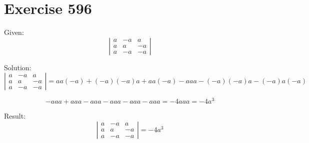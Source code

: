 \documentclass[a4paper, 10pt]{scrartcl}
\begin{document}
\section{Exercise 596}

Given:
\[
\left|
    \begin{array}{ccc}
        a & -a &  a\\
        a &  a & -a\\
        a & -a & -a
    \end{array}
\right|
\]

Solution:
\[
\left|
    \begin{array}{ccc}
        a & -a &  a\\
        a &  a & -a\\
        a & -a & -a
    \end{array}
\right| =
aa(-a) + (-a)(-a)a + aa(-a) - aaa - (-a)(-a)a - (-a)a(-a)
\]

\[
-aaa + aaa - aaa - aaa - aaa - aaa = -4aaa = -4a^{3}
\]

Result:
\[
\left|
    \begin{array}{ccc}
        a & -a &  a\\
        a &  a & -a\\
        a & -a & -a
    \end{array}
\right| = -4a^{3}
\]
\end{document}
